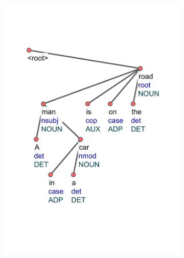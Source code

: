 \begin{figure}[ht]
    \centering
    \begin{subfigure}{0.4\textwidth}
        \centering
        \includegraphics[width=\textwidth,trim=20 120 20 100,clip]{figures/tree_1.pdf}
    \end{subfigure}
    \hskip 25pt
    \begin{subfigure}{0.4\textwidth}
        \centering

\end{subfigure}
\end{figure}

